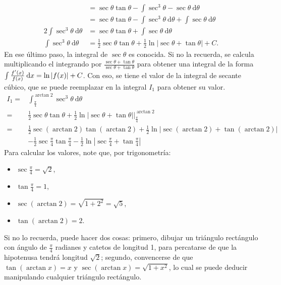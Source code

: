 \documentclass{fmbvecto}
\begin{document}
\begin{problema}
\begin{align*}
        &=  \sec \theta \tan \theta  - \int \sec^3 \theta - \sec \theta \: \mathrm{d}\theta \\
        &=  \sec \theta \tan \theta  - \int \sec^3 \theta \: \mathrm{d}\theta + \int \sec \theta \: \mathrm{d}\theta \\
        2 \int \sec^3 \theta \: \mathrm{d}\theta &= \sec \theta \tan \theta + \int \sec \theta \: \mathrm{d}\theta \\
        \int \sec^3 \theta \: \mathrm{d}\theta &= \frac{1}{2} \sec \theta \tan \theta + \frac{1}{2} \ln |\sec \theta + \tan \theta| + C.
    \end{align*}
    En ese último paso, la integral de \(\sec \theta\) es conocida. Si no la recuerda, se calcula multiplicando el integrando por \(\frac{\sec \theta + \tan \theta}{\sec \theta + \tan \theta}\) para obtener una integral de la forma \(\indint{\frac{f'(x)}{f(x)}}[x] = \ln \abs{f(x)} + C\). Con eso, se tiene el valor de la integral de secante cúbico, que se puede reemplazar en la integral \(I_1\) para obtener su valor.
    \begin{align*}
        I_1 =& \int_{\frac{\pi}{4}}^{\arctan 2} \sec^3 \theta \: \mathrm{d}\theta \\
        =& \frac{1}{2} \sec \theta \tan \theta + \frac{1}{2} \ln |\sec \theta + \tan \theta| \Bigg\vert_{\frac{\pi}{4}}^{\arctan 2} \\
        =& \frac{1}{2} \sec (\arctan 2) \tan (\arctan 2) + \frac{1}{2} \ln |\sec (\arctan 2) + \tan( \arctan 2)| \\ &- \frac{1}{2} \sec \frac{\pi}{4} \tan \frac{\pi}{4} - \frac{1}{2} \ln \left|\sec \frac{\pi}{4} + \tan \frac{\pi}{4}\right|
    \end{align*}
    Para calcular los valores, note que, por trigonometría:
    \begin{itemize}
        \item \(\sec \frac{\pi}{4} = \sqrt{2}\),
        \item \(\tan \frac{\pi}{4} = 1\),
        \item \(\sec (\arctan 2) = \sqrt{1 + 2^2} = \sqrt{5}\),
        \item \(\tan (\arctan 2) = 2\).
    \end{itemize}
    Si no lo recuerda, puede hacer dos cosas: primero, dibujar un triángulo rectángulo con ángulo de \(\frac{\pi}{4}\) radianes y catetos de longitud 1, para percatarse de que la hipotenusa tendrá longitud \(\sqrt{2}\); segundo, convencerse de que \(\tan (\arctan x) = x\) y \(\sec (\arctan x) = \sqrt{1 + x^2}\), lo cual se puede deducir manipulando cualquier triángulo rectángulo. \\
    

\end{problema}
\end{document}
